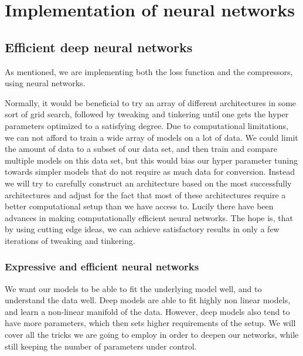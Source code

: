 \chapter{Implementation of neural networks}
\section{Efficient deep neural networks}
As mentioned, we are implementing both the loss function and the compressors, using neural networks. 

Normally, it would be beneficial to try an array of different architectures in some sort of grid search, followed by tweaking and tinkering until one gets the hyper parameters optimized to a satisfying degree. Due to computational limitations, we can not afford to train a wide array of models on a lot of data. We could limit the amount of data to a subset of our data set, and then train and compare multiple models on this data set, but this would bias our hyper parameter tuning towards simpler models that do not require as much data for conversion. Instead we will try to carefully construct an architecture based on the most successfully architectures and adjust for the fact that most of these architectures require a better computational setup than we have access to. Lucily there have been advances in making computationally efficient neural networks\cite{MobileNets}\cite{Inception}\cite{InceptionV3}\cite{InceptionV4}. The hope is, that by using cutting edge ideas, we can achieve satisfactory results in only a few iterations of tweaking and tinkering. 

\subsection{Expressive and efficient neural networks}
We want our models to be able to fit the underlying model well, and to understand the data well. Deep models are able to fit highly non linear models, and learn a non-linear manifold of the data\cite{Ae}\cite{NetworkInNetwork}\cite{InceptionV3}. However, deep models also tend to have more parameters, which then sets higher requirements of the setup. We will cover all the tricks we are going to employ in order to deepen our networks, while still keeping the number of parameters under control. 

